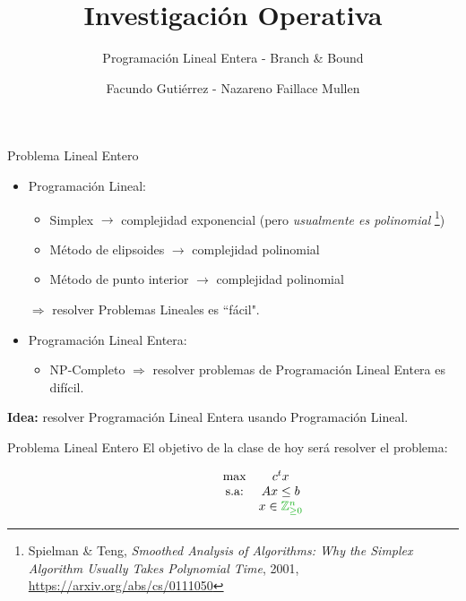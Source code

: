 \documentclass[10pt, aspectratio=169]{beamer}
\title{Investigación Operativa}
\subtitle{Programaci\'on Lineal Entera - Branch \& Bound}
\date{}
\author{Facundo Gutiérrez - Nazareno Faillace Mullen}
\institute{Departamento de Matemática - FCEN - UBA}
\begin{document}
\maketitle

\begin{frame}{Problema Lineal Entero}
    
    \begin{itemize}
        \item Programación Lineal:
        \begin{itemize}
            \normalsize
            \item Simplex $\rightarrow$ complejidad exponencial (pero \textit{usualmente es polinomial} \footnote{Spielman \& Teng, \textit{Smoothed Analysis of Algorithms: Why the Simplex Algorithm Usually Takes Polynomial Time}, 2001, \color{blue}\url{https://arxiv.org/abs/cs/0111050}})
            \item Método de elipsoides $\rightarrow$ complejidad polinomial
            \item Método de punto interior $\rightarrow$ complejidad polinomial
        \end{itemize}
        $\Rightarrow$ resolver Problemas Lineales es ``fácil".
        \vspace{1cm}
        \item Programación Lineal Entera:
        \begin{itemize}
            \normalsize
            \item NP-Completo $\Rightarrow$ resolver problemas de Programación Lineal Entera es difícil.
        \end{itemize}
    \end{itemize}

    \textbf{Idea:} resolver Programación Lineal Entera usando Programación Lineal.
\end{frame}

\begin{frame}{Problema Lineal Entero}
	El objetivo de la clase de hoy ser\'a resolver el problema:
	
	$$
	\begin{matrix}
	& \hspace{1cm} & \max & c^t x       \\ 
	& \hspace{1cm} & \text{s.a:}  & Ax \leq b \\      
    & \hspace{1cm} &	         &  x \in \color{goodgreen}{\mathbb{Z}}_{\geq 0}^n  \\
	\end{matrix}
	$$
	
\end{frame}
\end{document}
